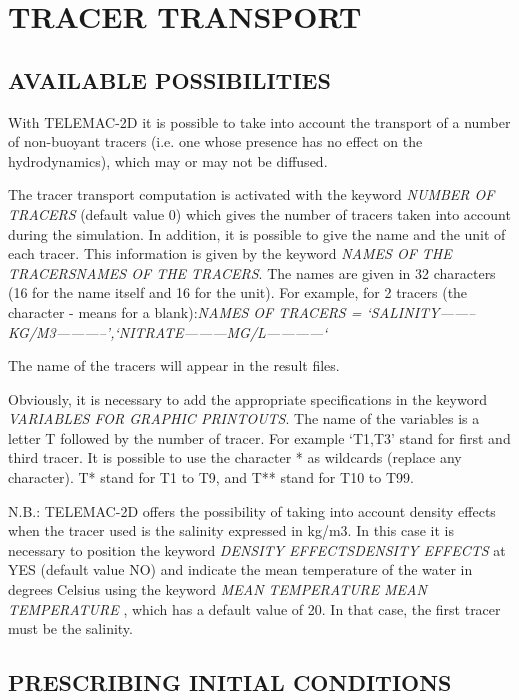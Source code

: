 

\chapter{ TRACER TRANSPORT}


\section{ AVAILABLE POSSIBILITIES}

 With TELEMAC-2D it is possible to take into account the transport of a number of non-buoyant tracers (i.e. one whose presence has no effect on the hydrodynamics), which may or may not be diffused.

 The tracer transport computation is activated with the keyword \textit{NUMBER OF TRACERS} (default value 0) which gives the number of tracers taken into account during the simulation. In addition, it is possible to give the name and the unit of each tracer. This information is given by the keyword \textit{NAMES OF THE TRACERSNAMES OF THE TRACERS}. The names are given in 32 characters (16 for the name itself and 16 for the unit). For example, for 2 tracers (the character - means for a blank):\textit{NAMES OF TRACERS = `SALINITY--------KG/M3-----------',`NITRATE---------MG/L------------`}

 The name of the tracers will appear in the result files.

 Obviously, it is necessary to add the appropriate specifications in the keyword \textit{VARIABLES FOR GRAPHIC PRINTOUTS}. The name of the variables is a letter T followed by the number of tracer. For example `T1,T3' stand for first and third tracer. It is possible to use the character * as wildcards (replace any character). T* stand for T1 to T9, and T** stand for T10 to T99.

 N.B.: TELEMAC-2D offers the possibility of taking into account density effects when the tracer used is the salinity expressed in kg/m3. In this case it is necessary to position the keyword \textit{DENSITY EFFECTSDENSITY EFFECTS} at YES (default value NO) and indicate the mean temperature of the water in degrees Celsius using the keyword \textit{MEAN TEMPERATURE} \textit{MEAN TEMPERATURE }, which has a default value of 20. In that case, the first tracer must be the salinity.


\section{ PRESCRIBING INITIAL CONDITIONS}

